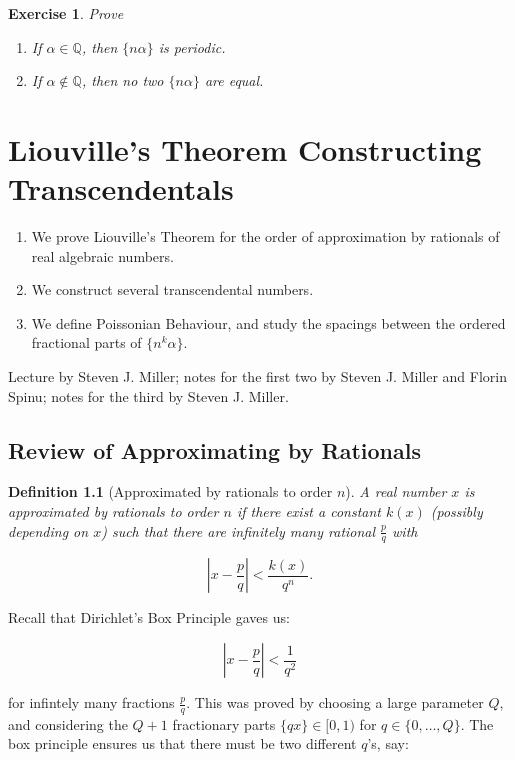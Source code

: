 \documentclass[12pt,letterpaper]{report}
\newcommand\be{\begin{equation}}
\newcommand\ee{\end{equation}}
\newcommand\ben{\begin{enumerate}}
\newcommand\een{\end{enumerate}}
\newcommand{\Q}{\mathbb{Q}}
\newtheorem{defi}[thm]{Definition}
\newtheorem{exe}[thm]{Exercise}
\begin{document}
\begin{exe} Prove
\ben
\item If $\alpha \in \Q$, then $\{n\alpha\}$ is periodic.
\item If $\alpha \not\in \Q$, then no two $\{n\alpha\}$ are equal.
\een
\end{exe}






\chapter{Liouville's Theorem Constructing Transcendentals}



\ben
\item We prove Liouville's Theorem for the order of approximation by
rationals of real algebraic numbers.

\item We construct several transcendental numbers.

\item We define Poissonian Behaviour, and study the spacings
between the ordered fractional parts of $\{n^k \alpha\}$. \een

Lecture by Steven J. Miller; notes for the first two by Steven J.
Miller and Florin Spinu; notes for the third by Steven J. Miller.


\section{Review of Approximating by Rationals}

\begin{defi}[Approximated by rationals to order $n$]
A real number $x$ is approximated by rationals to order $n$ if
there exist a constant $k(x)$ (possibly depending on $x$) such
that there are infinitely many rational $\frac{p}{q}$ with

\be \left|x-\frac{p}{q}\right|<\frac{k(x)}{q^n}. \ee

\end{defi}

Recall that Dirichlet's Box Principle gaves us:

\be \left|x-\frac{p}{q}\right|<\frac{1}{q^2} \ee

for infintely many fractions $\frac{p}{q}$. This was proved by
choosing a large parameter $Q$, and considering  the $Q+1$
fractionary parts $\{qx\}\in [0,1)$ for $q \in \{0,\dots,Q\}$. The
box principle ensures us that there must be two different $q$'s,
say:
\end{document}

